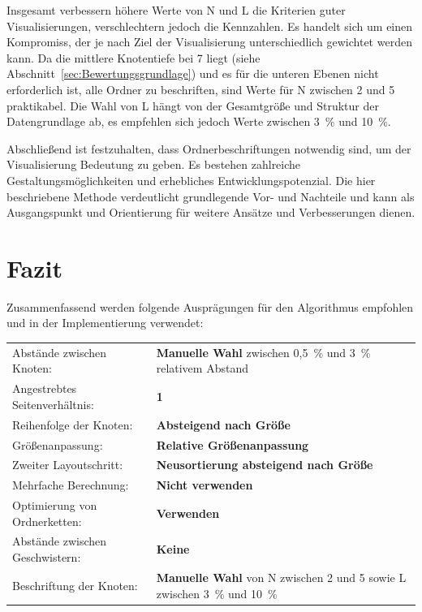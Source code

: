Insgesamt verbessern höhere Werte von N und L die Kriterien guter Visualisierungen, verschlechtern jedoch die Kennzahlen. Es handelt sich um einen Kompromiss, der je nach Ziel der Visualisierung unterschiedlich gewichtet werden kann. Da die mittlere Knotentiefe bei 7 liegt (siehe Abschnitt~\ref{sec:Bewertungsgrundlage}) und es für die unteren Ebenen nicht erforderlich ist, alle Ordner zu beschriften, sind Werte für N zwischen 2 und 5 praktikabel. Die Wahl von L hängt von der Gesamtgröße und Struktur der Datengrundlage ab, es empfehlen sich jedoch Werte zwischen 3~\% und 10~\%.

Abschließend ist festzuhalten, dass Ordnerbeschriftungen notwendig sind, um der Visualisierung Bedeutung zu geben. Es bestehen zahlreiche Gestaltungsmöglichkeiten und erhebliches Entwicklungspotenzial. Die hier beschriebene Methode verdeutlicht grundlegende Vor- und Nachteile und kann als Ausgangspunkt und Orientierung für weitere Ansätze und Verbesserungen dienen.

\newpage

\section{Fazit}

Zusammenfassend werden folgende Ausprägungen für den Algorithmus empfohlen und in der Implementierung verwendet:

\begin{table}[H]
    \hspace*{-0.3cm}
    \begin{tabularx}{1.2\textwidth}{lp{6.7cm}}
        Abstände zwischen Knoten: & \textbf{Manuelle Wahl} zwischen 0{,}5~\% und 3~\% relativem Abstand \\ 
        Angestrebtes Seitenverhältnis: & \textbf{1} \\ 
        Reihenfolge der Knoten: & \textbf{Absteigend nach Größe} \\ 
        Größenanpassung: & \textbf{Relative Größenanpassung} \\ 
        Zweiter Layoutschritt: & \textbf{Neusortierung absteigend nach Größe} \\ 
        Mehrfache Berechnung: & \textbf{Nicht verwenden} \\ 
        Optimierung von Ordnerketten: & \textbf{Verwenden} \\ 
        Abstände zwischen Geschwistern: & \textbf{Keine} \\ 
        Beschriftung der Knoten: & \textbf{Manuelle Wahl} von N zwischen 2 und 5 sowie L zwischen 3~\% und 10~\% \\
    \end{tabularx}
\end{table}

